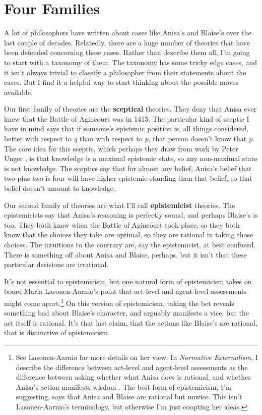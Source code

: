 \documentclass[
  11pt,
]{book}
\begin{document}
\hypertarget{fourfamilies}{%
\section{Four Families}\label{fourfamilies}}

A lot of philosophers have written about cases like Anisa's and Blaise's over the last couple of decades. Relatedly, there are a huge number of theories that have been defended concerning these cases. Rather than describe them all, I'm going to start with a taxonomy of them. The taxonomy has some tricky edge cases, and it isn't always trivial to classify a philosopher from their statements about the cases. But I find it a helpful way to start thinking about the possible moves available.

Our first family of theories are the \textbf{sceptical} theories. They deny that Anisa ever knew that the Battle of Agincourt was in 1415. The particular kind of sceptic I have in mind says that if someone's epistemic position is, all things considered, better with respect to \emph{q} than with respect to \emph{p}, that person doesn't know that \emph{p}. The core idea for this sceptic, which perhaps they draw from work by Peter Unger \citeyearpar{Unger1975}, is that knowledge is a maximal epistemic state, so any non-maximal state is not knowledge. The sceptics say that for almost any belief, Anisa's belief that two plus two is four will have higher epistemic standing than that belief, so that belief doesn't amount to knowledge.

Our second family of theories are what I'll call \textbf{epistemicist} theories. The epistemicists say that Anisa's reasoning is perfectly sound, and perhaps Blaise's is too. They both know when the Battle of Agincourt took place, so they both know that the choices they take are optimal, so they are rational in taking those choices. The intuitions to the contrary are, say the epistemicist, at best confused. There is something off about Anisa and Blaise, perhaps, but it isn't that these particular decisions are irrational.

It's not essential to epistemicism, but one natural form of epistemicism takes on board Maria Lasonen-Aarnio's point that act-level and agent-level assessments might come apart.\footnote{See Lasonen-Aarnio \citetext{\citeyear{Lasonen-Aarnio2010b}; \citeyear{Lasonen-Aarnio2014}} for more details on her view. In \emph{Normative Externalism}, I describe the difference between act-level and agent-level assessments as the difference between asking whether what Anisa does is rational, and whether Anisa's action manifests wisdom \citep[124-5]{Weatherson2019}. The best form of epistemicism, I'm suggesting, says that Anisa and Blaise are rational but unwise. This isn't Lasonen-Aarnio's terminology, but otherwise I'm just coopting her ideas.} On this version of epistemicism, taking the bet reveals something bad about Blaise's character, and arguably manifests a vice, but the act itself is rational. It's that last claim, that the actions like Blaise's are rational, that is distinctive of epistemicism.
\end{document}
